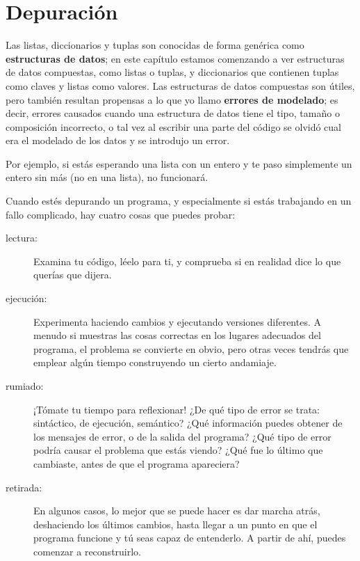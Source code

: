 

\section{Depuración}


Las listas, diccionarios y tuplas son conocidas de forma genérica como
{\bf estructuras de datos}; en este capítulo estamos comenzando a ver
estructuras de datos compuestas, como listas o tuplas, y diccionarios que contienen tuplas
como claves y listas como valores. Las estructuras de datos compuestas son útiles, pero
también resultan propensas a lo que yo llamo {\bf errores de modelado}; es decir, errores
causados cuando una estructura de datos tiene el tipo, tamaño o composición incorrecto,
o tal vez al escribir una parte del código se olvidó cual era el modelado
de los datos y se introdujo un error.

Por ejemplo, si estás esperando una lista con un entero y te
paso simplemente un entero sin más (no en una lista), no funcionará.

Cuando estés depurando un programa, y especialmente si estás
trabajando en un fallo complicado, hay cuatro cosas que puedes probar:

\begin{description}

\item[lectura:] Examina tu código, léelo para ti, y comprueba
si en realidad dice lo que querías que dijera.

\item[ejecución:] Experimenta haciendo cambios y ejecutando versiones
diferentes. A menudo si muestras las cosas correctas en los lugares
adecuados del programa, el problema se convierte en obvio, pero otras veces
tendrás que emplear algún tiempo construyendo un cierto andamiaje.

\item[rumiado:] ¡Tómate tu tiempo para reflexionar! ¿De qué tipo de error
se trata: sintáctico, de ejecución, semántico? ¿Qué información puedes obtener de
los mensajes de error, o de la salida del programa? ¿Qué tipo de
error podría causar el problema que estás viendo? ¿Qué fue lo último
que cambiaste, antes de que el programa apareciera?

\item[retirada:] En algunos casos, lo mejor que se puede hacer
es dar marcha atrás, deshaciendo los últimos cambios, hasta llegar
a un punto en que el programa funcione y tú seas capaz de entenderlo. A partir de ahí,
puedes comenzar a reconstruirlo.

\end{description}

